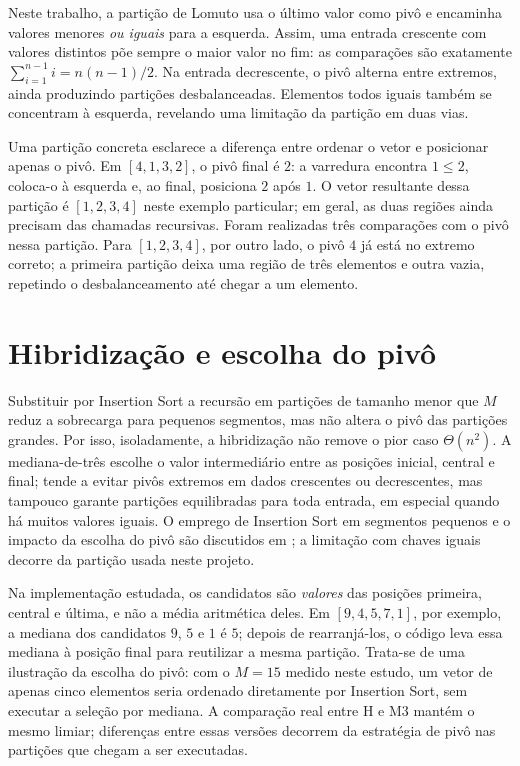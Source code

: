 Neste trabalho, a partição de Lomuto usa o último valor como pivô e encaminha valores menores \emph{ou iguais} para a esquerda. Assim, uma entrada crescente com valores distintos põe sempre o maior valor no fim: as comparações são exatamente $\sum_{i=1}^{n-1}i=n(n-1)/2$. Na entrada decrescente, o pivô alterna entre extremos, ainda produzindo partições desbalanceadas. Elementos todos iguais também se concentram à esquerda, revelando uma limitação da partição em duas vias.

Uma partição concreta esclarece a diferença entre ordenar o vetor e posicionar apenas o pivô. Em $[4,1,3,2]$, o pivô final é $2$: a varredura encontra $1\leq2$, coloca-o à esquerda e, ao final, posiciona $2$ após $1$. O vetor resultante dessa partição é $[1,2,3,4]$ neste exemplo particular; em geral, as duas regiões ainda precisam das chamadas recursivas. Foram realizadas três comparações com o pivô nessa partição. Para $[1,2,3,4]$, por outro lado, o pivô $4$ já está no extremo correto; a primeira partição deixa uma região de três elementos e outra vazia, repetindo o desbalanceamento até chegar a um elemento.

\section{Hibridização e escolha do pivô}

Substituir por Insertion Sort a recursão em partições de tamanho menor que $M$ reduz a sobrecarga para pequenos segmentos, mas não altera o pivô das partições grandes. Por isso, isoladamente, a hibridização não remove o pior caso $\Theta(n^2)$. A mediana-de-três escolhe o valor intermediário entre as posições inicial, central e final; tende a evitar pivôs extremos em dados crescentes ou decrescentes, mas tampouco garante partições equilibradas para toda entrada, em especial quando há muitos valores iguais. O emprego de Insertion Sort em segmentos pequenos e o impacto da escolha do pivô são discutidos em \cite{gfg_insertion,gfg_quick}; a limitação com chaves iguais decorre da partição usada neste projeto.

Na implementação estudada, os candidatos são \emph{valores} das posições primeira, central e última, e não a média aritmética deles. Em $[9,4,5,7,1]$, por exemplo, a mediana dos candidatos $9$, $5$ e $1$ é $5$; depois de rearranjá-los, o código leva essa mediana à posição final para reutilizar a mesma partição. Trata-se de uma ilustração da escolha do pivô: com o $M=15$ medido neste estudo, um vetor de apenas cinco elementos seria ordenado diretamente por Insertion Sort, sem executar a seleção por mediana. A comparação real entre H e M3 mantém o mesmo limiar; diferenças entre essas versões decorrem da estratégia de pivô nas partições que chegam a ser executadas.

